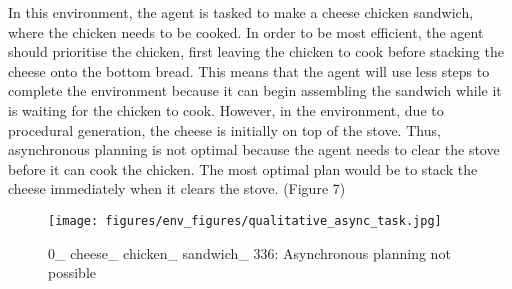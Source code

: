 In this environment, the agent is tasked to make a cheese chicken sandwich, where the chicken needs to be cooked. In order to be most efficient, the agent should prioritise the chicken, first leaving the chicken to cook before stacking the cheese onto the bottom bread. This means that the agent will use less steps to complete the environment because it can begin assembling the sandwich while it is waiting for the chicken to cook. However, in the environment, due to procedural generation, the cheese is initially on top of the stove. Thus, asynchronous planning is not optimal because the agent needs to clear the stove before it can cook the chicken. The most optimal plan would be to stack the cheese immediately when it clears the stove. (Figure 7)

\begin{figure}[t!]
    \centering
    \texttt{[image: figures/env\_figures/qualitative\_async\_task.jpg]}
    \caption{0\_ cheese\_ chicken\_ sandwich\_ 336: Asynchronous planning not possible}
    \label{fig:piechart_followup}
\end{figure}